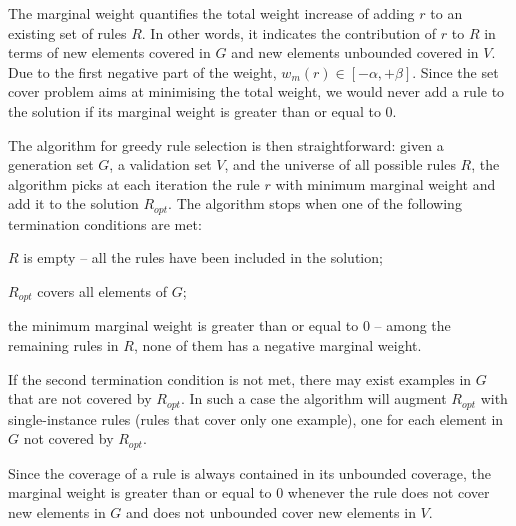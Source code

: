 The marginal weight quantifies the total weight increase of adding $r$ to an existing set of rules $R$. In other words, it indicates the contribution of $r$ to $R$ in terms of new elements covered in $G$ and new elements unbounded covered in $V$. Due to the first negative part of the weight, $w_m(r) \in [-\alpha,+\beta]$. Since the set cover problem aims at minimising the total weight, we would never add a rule to the solution if its marginal weight is greater than or equal to $0$.

%

The algorithm for greedy rule selection is then straightforward:
given a generation set $G$, a validation set $V$, and the universe of all possible rules $R$, the algorithm picks at each iteration the rule $r$ with minimum marginal weight and add it to the solution $R_{opt}$.
The algorithm stops when one of the following termination conditions are met:
\begin{inparaenum} [\itshape1)]
	\item $R$ is empty -- all the rules have been included in the solution;
	\item $R_{opt}$ covers all elements of $G$;
	\item the minimum marginal weight is greater than or equal to $0$ -- among the remaining rules in $R$, none of them has a negative marginal weight.
\end{inparaenum}
If the second termination condition is not met, there may exist examples in $G$ that are not covered by $R_{opt}$. In such a case the algorithm will augment $R_{opt}$ with single-instance rules (rules that cover only one example), one for each element in $G$ not covered by $R_{opt}$.

Since the coverage of a rule is always contained in its unbounded coverage, the marginal weight is greater than or equal to $0$ whenever the rule does not cover new elements in $G$ and does not unbounded cover new elements in $V$. 

